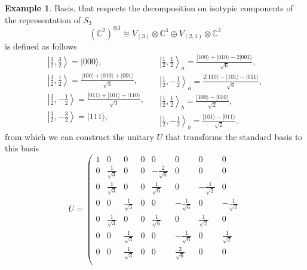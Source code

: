 \documentclass[10pt,twocolumn,superscriptaddress,aps,amsmath,amssymb,citeautoscript,floatfix,prx]{revtex4-2}
\theoremstyle{plain}
\theoremstyle{plain}
\theoremstyle{plain}
\theoremstyle{plain}
\theoremstyle{plain}
\theoremstyle{plain}
\theoremstyle{plain}
\theoremstyle{definition}
\newtheorem{smexample}[smtheorem]{Example}
\theoremstyle{plain}
\begin{document}
\begin{appendix}
\begin{smexample}\label{ex:Sn_block_diagonalization}
Basis, that respects the decomposition on isotypic components of the representation of $S_3$ 
\[
    \left(\mathbb{C}^2\right)^{\otimes 3} \cong V_{(3)} \otimes \mathbb{C}^4 \oplus V_{{(2,1)}} \otimes \mathbb{C}^2
\]
is defined as follows
\[
    \begin{gathered}
    \left|\frac{3}{2}, \frac{3}{2}\right\rangle=|000\rangle, \\
    \left|\frac{3}{2}, \frac{1}{2}\right\rangle=\frac{|100\rangle+|010\rangle+|001\rangle}{\sqrt{3}}, \\
    \left|\frac{3}{2}, -\frac{1}{2}\right\rangle=\frac{|011\rangle+|101\rangle+|110\rangle}{\sqrt{3}}, \\
    \left|\frac{3}{2}, -\frac{3}{2}\right\rangle=|111\rangle, \\
    \end{gathered}\quad
    \begin{gathered}
    \left|\frac{1}{2}, \frac{1}{2}\right\rangle_a=\frac{|100\rangle+|010\rangle-2|001\rangle}{\sqrt{6}}, \\
    \left|\frac{1}{2}, -\frac{1}{2}\right\rangle_a=\frac{2|110\rangle-|101\rangle-|011\rangle}{\sqrt{6}}, \\
    \left|\frac{1}{2}, \frac{1}{2}\right\rangle_b=\frac{|100\rangle-|010\rangle}{\sqrt{2}}, \\
    \left|\frac{1}{2}, -\frac{1}{2}\right\rangle_b=\frac{|101\rangle-|011\rangle}{\sqrt{2}} .
    \end{gathered}
\]
from which we can construct the unitary $U$ that transforms the standard basis to this basis
\begin{equation}\label{eq:basis_transform_example}
    U=\left(\begin{array}{cccccccc}
    1 & 0 & 0 & 0 & 0 & 0 & 0 & 0 \\
    0 & \frac{1}{\sqrt{3}} & 0 & 0 & -\frac{2}{\sqrt{6}} & 0 & 0 & 0 \\
    0 & \frac{1}{\sqrt{3}} & 0 & 0 & \frac{1}{\sqrt{6}} & 0 & -\frac{1}{\sqrt{2}} & 0 \\
    0 & 0 & \frac{1}{\sqrt{3}} & 0 & 0 & -\frac{1}{\sqrt{6}} & 0 & -\frac{1}{\sqrt{2}} \\
    0 & \frac{1}{\sqrt{3}} & 0 & 0 & \frac{1}{\sqrt{6}} & 0 & \frac{1}{\sqrt{2}} & 0 \\
    0 & 0 & \frac{1}{\sqrt{3}} & 0 & 0 & -\frac{1}{\sqrt{6}} & 0 & \frac{1}{\sqrt{2}} \\
    0 & 0 & \frac{1}{\sqrt{3}} & 0 & 0 & \frac{2}{\sqrt{6}} & 0 & 0 \\

\end{array}
\end{equation}
\end{smexample}
\end{appendix}
\end{document}
